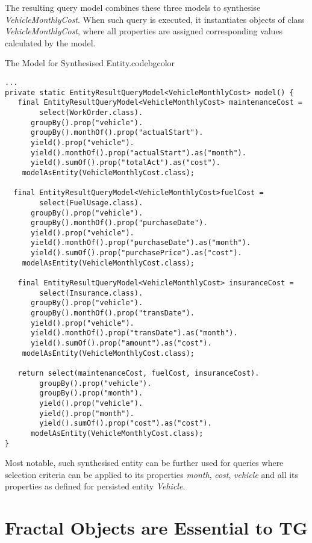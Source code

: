   The resulting query model combines these three models to synthesise \emph{VehicleMonthlyCost}.
  When such query is executed, it instantiates objects of class \emph{VehicleMonthlyCost}, where all properties are assigned corresponding values calculated by the model.

  \begin{code}{The Model for Synthesised Entity.}{\label{ch01:00:lst:synthesised-entity-model}}{codebgcolor}
    \begin{lstlisting}[numbersep=10pt]
...   
private static EntityResultQueryModel<VehicleMonthlyCost> model() {
   final EntityResultQueryModel<VehicleMonthlyCost> maintenanceCost = 
        select(WorkOrder.class).
	  groupBy().prop("vehicle").
	  groupBy().monthOf().prop("actualStart").
	  yield().prop("vehicle").
	  yield().monthOf().prop("actualStart").as("month").
	  yield().sumOf().prop("totalAct").as("cost").
	modelAsEntity(VehicleMonthlyCost.class);

  final EntityResultQueryModel<VehicleMonthlyCost>fuelCost = 
        select(FuelUsage.class).
	  groupBy().prop("vehicle").
	  groupBy().monthOf().prop("purchaseDate").
	  yield().prop("vehicle").
	  yield().monthOf().prop("purchaseDate").as("month").
	  yield().sumOf().prop("purchasePrice").as("cost").
	modelAsEntity(VehicleMonthlyCost.class);

   final EntityResultQueryModel<VehicleMonthlyCost> insuranceCost = 
        select(Insurance.class).
	  groupBy().prop("vehicle").
	  groupBy().monthOf().prop("transDate").
	  yield().prop("vehicle").
	  yield().monthOf().prop("transDate").as("month").
	  yield().sumOf().prop("amount").as("cost").
	modelAsEntity(VehicleMonthlyCost.class);

   return select(maintenanceCost, fuelCost, insuranceCost).
	    groupBy().prop("vehicle").
	    groupBy().prop("month").
	    yield().prop("vehicle").
	    yield().prop("month").
	    yield().sumOf().prop("cost").as("cost").
	  modelAsEntity(VehicleMonthlyCost.class);
}  
    \end{lstlisting}   
  \end{code}  

  Most notable, such synthesised entity can be further used for queries where selection criteria can be applied to its properties \emph{month}, \emph{cost}, \emph{vehicle} and all its properties as defined for persisted entity \emph{Vehicle}.

  \section{Fractal Objects are Essential to TG}
  
